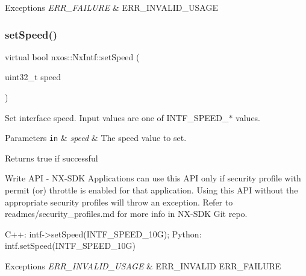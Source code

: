 \begin{DoxyExceptions}{Exceptions}
{\em E\+R\+R\+\_\+\+F\+A\+I\+L\+U\+RE} & E\+R\+R\+\_\+\+I\+N\+V\+A\+L\+I\+D\+\_\+\+U\+S\+A\+GE \\
\hline
\end{DoxyExceptions}
\mbox{\label{classnxos_1_1_nx_intf_ad42e229fc4c3aa9111b3a8805d55588c}} 
\subsubsection{\texorpdfstring{set\+Speed()}{setSpeed()}}
{\footnotesize\ttfamily virtual bool nxos\+::\+Nx\+Intf\+::set\+Speed (\begin{DoxyParamCaption}\item[{uint32\+\_\+t}]{speed }\end{DoxyParamCaption})\hspace{0.3cm}{\ttfamily [pure virtual]}}

Set interface speed. Input values are one of I\+N\+T\+F\+\_\+\+S\+P\+E\+E\+D\+\_\+$\ast$ values. 
\begin{DoxyParams}[1]{Parameters}
\mbox{\tt in}  & {\em speed} & The speed value to set. \\
\hline
\end{DoxyParams}
\begin{DoxyReturn}{Returns}
true if successful
\end{DoxyReturn}
\begin{DoxyVerb}Write API - NX-SDK Applications can use this API only if security profile with permit (or) throttle is 
            enabled for that application. Using this API without the appropriate security profiles will
            throw an exception. Refer to readmes/security_profiles.md for more info in NX-SDK Git repo.
\end{DoxyVerb}



\begin{DoxyCode}
C++:
    intf->setSpeed(INTF\_SPEED\_10G);
Python:
    intf.setSpeed(INTF\_SPEED\_10G)
\end{DoxyCode}



\begin{DoxyExceptions}{Exceptions}
{\em E\+R\+R\+\_\+\+I\+N\+V\+A\+L\+I\+D\+\_\+\+U\+S\+A\+GE} & E\+R\+R\+\_\+\+I\+N\+V\+A\+L\+ID E\+R\+R\+\_\+\+F\+A\+I\+L\+U\+RE \\
\hline
\end{DoxyExceptions}
\mbox{\label{classnxos_1_1_nx_intf_af5d5c584845fe42bea0d1d40f9907065}} 
